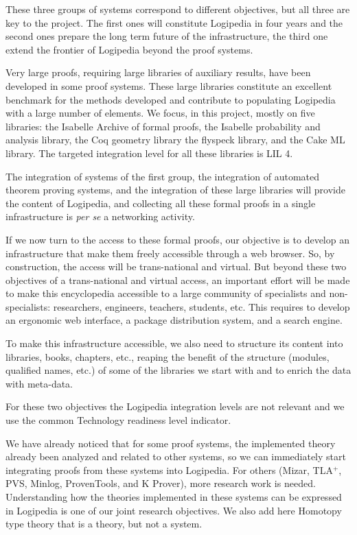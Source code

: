 These three groups of systems correspond to different
objectives, but all three are key to the project. The first ones will
constitute Logipedia in four years and the second ones prepare the
long term future of the infrastructure, the third one extend the
frontier of Logipedia beyond the proof systems.

Very large proofs, requiring large libraries of auxiliary results,
have been developed in some proof systems. These large libraries
constitute an excellent benchmark for the methods developed and
contribute to populating Logipedia with a large number of elements.
We focus, in this project, mostly on five libraries: the Isabelle
Archive of formal proofs, the Isabelle probability and analysis
library, the Coq geometry library the flyspeck library, and the Cake
ML library.  The targeted integration level for all these libraries is
LIL 4.

The integration of systems of the first group, the integration of
automated theorem proving systems, and the integration of these large
libraries will provide the content of Logipedia, and collecting all
these formal proofs in a single infrastructure is {\em per se} a
networking activity.

If we now turn to the access to these formal proofs, our objective is
to develop an infrastructure that make them freely accessible through
a web browser. So, by construction, the access will be trans-national
and virtual. But beyond these two objectives of a trans-national and
virtual access, an important effort will be made to make this
encyclopedia accessible to a large community of specialists and
non-specialists: researchers, engineers, teachers, students, etc.
This requires to develop an ergonomic web interface,
a package distribution system, and a search engine.

To make this infrastructure accessible, we also need to structure its
content into libraries, books, chapters, etc., reaping the benefit of
the structure (modules, qualified names, etc.) of some of the
libraries we start with and to enrich the data with meta-data.

For these two objectives the Logipedia integration levels are not
relevant and we use the common Technology readiness level indicator.

We have already noticed that for some proof systems, the implemented
theory already been analyzed and related to other systems, so we can
immediately start integrating proofs from these systems into
Logipedia. For others (Mizar, TLA$^+$, PVS, Minlog, ProvenTools, and
K Prover), more research work is needed. Understanding how the
theories implemented in these systems can be expressed in Logipedia is
one of our joint research objectives.  We also add here Homotopy type
theory that is a theory, but not a system.

